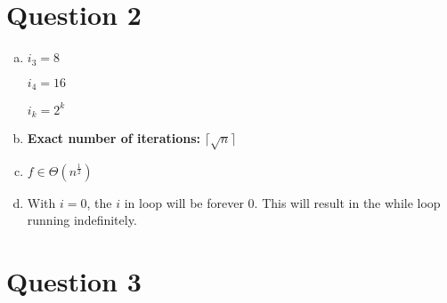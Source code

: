 \documentclass[12pt]{article}
\begin{document}
\section*{Question 2}
\begin{enumerate}[a.]
    \item

    $i_3 = 8$

    $i_4 = 16$

    $i_k = 2^k$

    \item

    \textbf{Exact number of iterations:} $\lceil \sqrt{n} \rceil$

    \item

    $f \in \Theta (n^{\frac{1}{2}})$

    \item

    With $i = 0$, the $i$ in loop will be forever 0. This will result in the while
    loop running indefinitely.

\end{enumerate}

\section*{Question 3}
\end{document}
